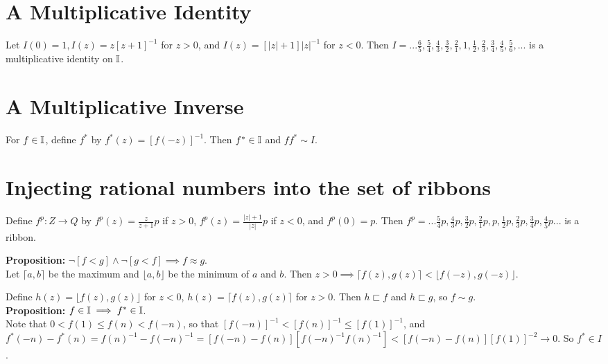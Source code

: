 \documentclass{article}
\renewcommand{\b}{\textbf}
\newcommand{\ribbons}{\Bbb I}
\newcommand{\forks}{ \sqsubset}
\newcommand{\ident}{I}
\begin{document}
{{\section{A Multiplicative Identity}

Let $\ident(0) = 1, \ident(z) = z[z+1]^{-1}$ for $z > 0$, and $\ident(z) = [|z|+1]|z|^{-1}$ for $z < 0$. Then  $\ident = ...\frac{6}{5},\frac{5}{4},\frac{4}{3},\frac{3}{2},\frac{2}{1},1,\frac{1}{2},\frac{2}{3},\frac{3}{4},\frac{4}{5},\frac{5}{6},... $ is a multiplicative identity on $\ribbons$. 

\section{A Multiplicative Inverse}

For $f \in \ribbons$, define $f^*$ by $f^*(z) =  [ f(-z) ]^{-1} $. Then $f^* \in \ribbons$ and $ff^* \sim \ident$.

\section{Injecting rational numbers into the set of ribbons}

Define $f^p : Z \to Q$ by $f^p(z) = \frac{z}{z+1}p$ if $z > 0$, $f^p(z) = \frac{|z|+1}{|z|}p$ if $z < 0$, and $f^p(0) = p$. Then $f^p = ... \frac{5}{4}p,\frac{4}{3}p,\frac{3}{2}p,\frac{2}{1}p,p,\frac{1}{2}p,\frac{2}{3}p,\frac{3}{4}p,\frac{4}{5}p ...$ is a ribbon.

\textbf{Proposition:} $\neg [ f < g ] \wedge \neg [ g < f ]  \implies f \approx g$.\\ 


Let $\lceil{a,b}\rceil$ be the maximum and $\lfloor{a,b}\rfloor$ be the minimum of $a$ and $b$.  Then  $z > 0  \implies \lceil f(z),g(z) \rceil < \lfloor f(-z),g(-z) \rfloor$. 

Define $h(z) = \lfloor f(z),g(z) \rfloor$ for $z < 0$, $h(z) = \lceil f(z),g(z) \rceil$ for $ z > 0$. Then $h \forks f$ and $h \forks g$, so $f \sim g$.\\

\b{Proposition:} $f \in \ribbons \implies f^* \in \ribbons$.\\


Note that $0 < f(1) \le f(n) < f(-n)$, so that $[f(-n)]^{-1} <  [f(n)]^{-1} \le [f(1)]^{-1}$, and $f^*(-n) - f^* (n) = f(n)^{-1} - f(-n)^{-1} = [f(-n) - f(n)][f(-n)^{-1}f(n)^{-1}] < [f(-n) - f(n)][f(1)]^{-2} \to 0$. So $f^* \in I$.\\

}}
\end{document}
